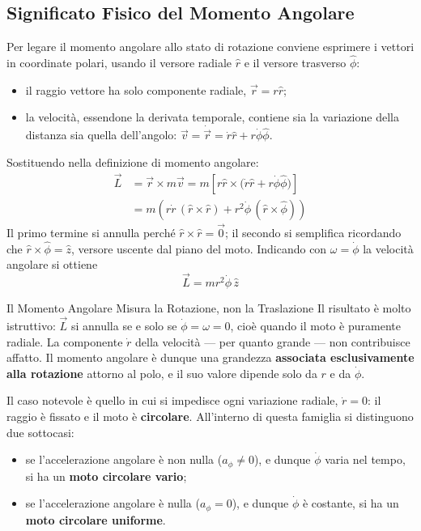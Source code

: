 \subsection{Significato Fisico del Momento Angolare}

Per legare il momento angolare allo stato di rotazione conviene esprimere i vettori in coordinate polari, usando il versore radiale $\hat{r}$ e il versore trasverso $\hat{\phi}$:
\begin{itemize}
    \item il raggio vettore ha solo componente radiale, $\vec{r} = r\hat{r}$;
    \item la velocità, essendone la derivata temporale, contiene sia la variazione della distanza sia quella dell'angolo: $\vec{v} = \dot{\vec{r}} = \dot{r}\hat{r} + r\dot{\phi}\hat{\phi}$.
\end{itemize}

Sostituendo nella definizione di momento angolare:
\begin{equation}
    \begin{split}
        \vec{L} &= \vec{r} \times m\vec{v}
        = m \left[ r\hat{r} \times \big(\dot{r}\hat{r} + r\dot{\phi}\hat{\phi}\big) \right] \\
        &= m \left( r\dot{r}\,(\hat{r} \times \hat{r}) + r^2 \dot{\phi}\,(\hat{r} \times \hat{\phi}) \right)
    \end{split}
\end{equation}
Il primo termine si annulla perché $\hat{r} \times \hat{r} = \vec{0}$; il secondo si semplifica ricordando che $\hat{r} \times \hat{\phi} = \hat{z}$, versore uscente dal piano del moto. Indicando con $\omega = \dot{\phi}$ la velocità angolare si ottiene
\begin{equation}
    \vec{L} = m r^2 \dot{\phi} \, \hat{z}
\end{equation}

\begin{osservazione}{Il Momento Angolare Misura la Rotazione, non la Traslazione}
Il risultato è molto istruttivo: $\vec{L}$ si annulla se e solo se $\dot{\phi} = \omega = 0$, cioè quando il moto è puramente radiale. La componente $\dot{r}$ della velocità --- per quanto grande --- non contribuisce affatto. Il momento angolare è dunque una grandezza \textbf{associata esclusivamente alla rotazione} attorno al polo, e il suo valore dipende solo da $r$ e da $\dot{\phi}$.
\end{osservazione}

Il caso notevole è quello in cui si impedisce ogni variazione radiale, $\dot{r} = 0$: il raggio è fissato e il moto è \textbf{circolare}. All'interno di questa famiglia si distinguono due sottocasi:
\begin{itemize}
    \item se l'accelerazione angolare è non nulla ($a_\phi \neq 0$), e dunque $\dot{\phi}$ varia nel tempo, si ha un \textbf{moto circolare vario};
    \item se l'accelerazione angolare è nulla ($a_\phi = 0$), e dunque $\dot{\phi}$ è costante, si ha un \textbf{moto circolare uniforme}.
\end{itemize}

